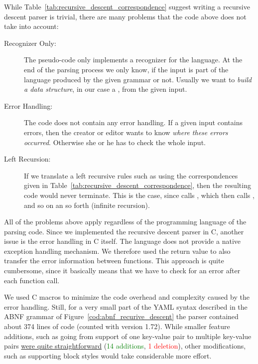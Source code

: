 \newpage
While Table~\ref{tab:recursive_descent_correspondence} suggest writing a recursive descent parser is trivial, there are many problems that the code above does not take into account:

\begin{description}
  \item [Recognizer Only:] The pseudo-code only implements a recognizer for the language. At the end of the parsing process we only know, if the input is part of the language produced by the given grammar or not. Usually we want to \emph{build a data structure}, in our case a , from the given input.

  \item [Error Handling:] The code does not contain any error handling. If a given input contains errors, then the creator or editor wants to know \emph{where these errors occurred}. Otherwise she or he has to check the whole input.

  \item [Left Recursion:] If we translate a left recursive rules such as  using the correspondences given in Table~\ref{tab:recursive_descent_correspondence}, then the resulting code would never terminate. This is the case, since  calls , which then calls , and so on an so forth (infinite recursion).
\end{description}

All of the problems above apply regardless of the programming language of the parsing code. Since we implemented the recursive descent parser in C, another issue is the error handling in C itself. The language does not provide a native exception handling mechanism. We therefore used the return value to also transfer the error information between functions. This approach is quite cumbersome, since it basically means that we have to check for an error after each function call.

We used C macros to minimize the code overhead and complexity caused by the error handling. Still, for a very small part of the YAML syntax described in the ABNF grammar of Figure~\ref{cod:abnf_recurive_descent} the parser contained about 374 lines of code (counted with  version 1.72). While smaller feature additions, such as going from support of one key-value pair to multiple key-value pairs \href{https://github.com/ElektraInitiative/libelektra/commit/17aa7a6ea5d9261287104213dcba67f4d0a0fcbc}{were quite straightforward} (\textcolor{Green}{14 additions}, \textcolor{Red}{1 deletion}), other modifications, such as supporting block styles would take considerable more effort.

